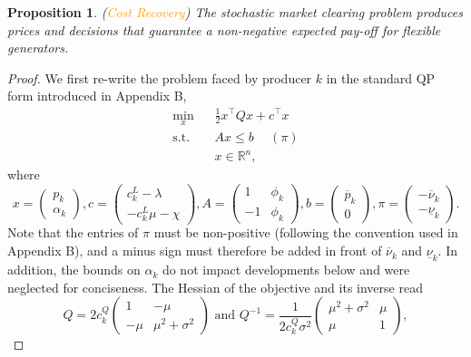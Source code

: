 \documentclass{article}
\newtheorem{proposition}{Proposition}
\begin{document}
\begin{proposition}
(\textcolor{orange}{Cost Recovery}) The stochastic market clearing problem produces prices and decisions that guarantee a non-negative expected pay-off for flexible generators.
\end{proposition}
\begin{proof}
We first re-write the problem faced by producer $k$ in the standard QP form introduced in Appendix B,
\begin{align*}
\underset{x}{\min} \hspace{10pt} & \frac{1}{2}x^\top Q x + c^\top x\\
\mbox{s.t. } & Ax \le b \hspace{15pt} (\pi)\\
&x \in \mathbb{R}^n,
\end{align*}
where
\begin{equation*}
x = \begin{pmatrix} p_k \\ \alpha_k \end{pmatrix}, c = \begin{pmatrix} c_k^L - \lambda \\ -c_k^L \mu - \chi \end{pmatrix}, A = \begin{pmatrix} 1 & \phi_k \\ -1 & \phi_k \end{pmatrix}, b = \begin{pmatrix} \overline{p}_k\\0\end{pmatrix}, \pi = \begin{pmatrix} -\overline{\nu}_k \\ -\underline{\nu}_k \end{pmatrix}.
\end{equation*}
Note that the entries of $\pi$ must be non-positive (following the convention used in Appendix B), and a minus sign must therefore be added in front of $\overline{\nu}_k$ and $\underline{\nu}_k$. In addition, the bounds on $\alpha_k$ do not impact developments below and were neglected for conciseness. The Hessian of the objective and its inverse read
\begin{equation*}
Q = 2 c_k^Q  \begin{pmatrix} 1 & -\mu \\ -\mu & \mu^2 + \sigma^2 \end{pmatrix} \mbox{ and } Q^{-1} = \frac{1}{2 c_k^Q \sigma^2} \begin{pmatrix} \mu^2 + \sigma^2 & \mu \\ \mu & 1 \end{pmatrix},

\end{equation*}
\end{proof}
\end{document}
